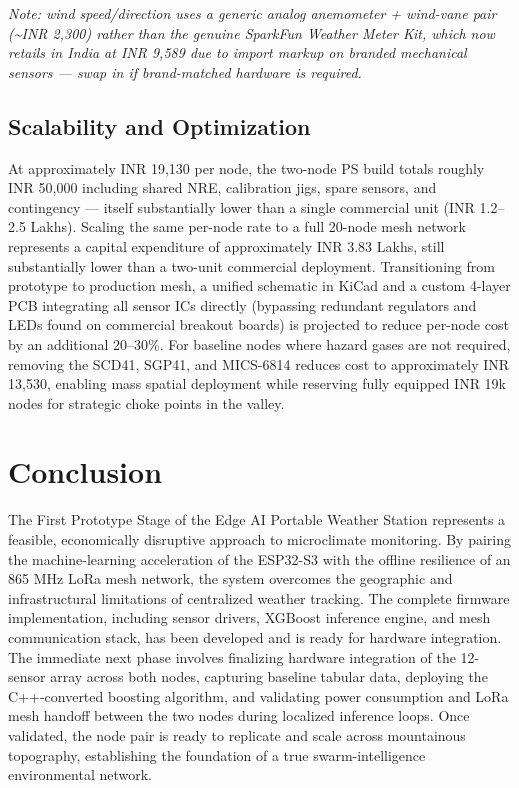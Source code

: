 \documentclass[conference]{IEEEtran}
\begin{document}
\textit{Note: wind speed/direction uses a generic analog anemometer +
wind-vane pair (\textasciitilde INR 2,300) rather than the genuine SparkFun
Weather Meter Kit, which now retails in India at INR 9,589 due to import
markup on branded mechanical sensors --- swap in if brand-matched hardware
is required.}

\subsection{Scalability and Optimization}

At approximately INR 19,130 per node, the two-node PS build totals roughly
INR 50,000 including shared NRE, calibration jigs, spare sensors, and
contingency --- itself substantially lower than a single commercial unit
(INR 1.2--2.5 Lakhs). Scaling the same
per-node rate to a full 20-node mesh network represents a capital
expenditure of approximately INR 3.83 Lakhs, still substantially lower
than a two-unit commercial deployment. Transitioning from prototype to
production mesh, a unified schematic in KiCad and a custom 4-layer PCB
integrating all sensor ICs directly (bypassing redundant regulators and
LEDs found on commercial breakout boards) is projected to reduce per-node
cost by an additional 20--30\%. For baseline nodes where hazard gases are
not required, removing the SCD41, SGP41, and MICS-6814 reduces cost to
approximately INR 13,530, enabling mass spatial deployment while reserving
fully equipped INR 19k nodes for strategic choke points in the valley.

\section{Conclusion}
\label{sec:conclusion}

The First Prototype Stage of the Edge AI Portable Weather Station
represents a feasible, economically disruptive approach to microclimate
monitoring. By pairing the machine-learning acceleration of the ESP32-S3
with the offline resilience of an 865 MHz LoRa mesh network, the system
overcomes the geographic and infrastructural limitations of centralized
weather tracking. The complete firmware implementation, including sensor
drivers, XGBoost inference engine, and mesh communication stack, has been
developed and is ready for hardware integration. The immediate next phase involves finalizing hardware
integration of the 12-sensor array across both nodes, capturing baseline
tabular data, deploying the C++-converted boosting algorithm, and
validating power consumption and LoRa mesh handoff between the two nodes
during localized inference loops. Once validated, the node pair is ready
to replicate and scale across mountainous topography, establishing the
foundation of a true swarm-intelligence environmental network.
\end{document}
